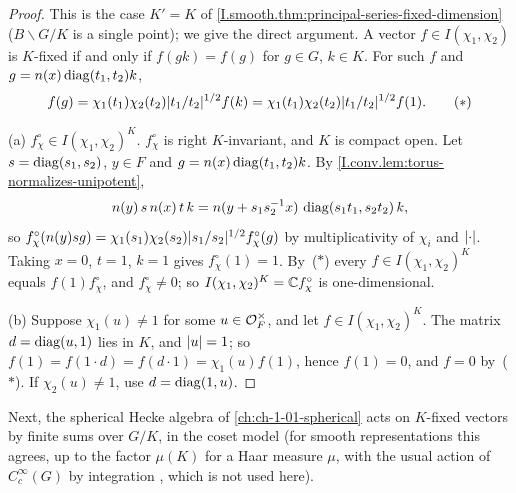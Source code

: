 \begin{theorem}
\end{theorem}
\begin{proof}
This is the case $K'=K$ of \cref{I.smooth.thm:principal-series-fixed-dimension} ($B\backslash G/K$ is a single point);
we give the direct argument. A vector $f\in I(\chi_1,\chi_2)$ is $K$-fixed if and only if $f(gk)=f(g)$ for $g\in G$,
$k\in K$. For such $f$ and $g=n(x)\operatorname{diag}(t_1,t_2)k$,
\[
  f(g)=\chi_1(t_1)\chi_2(t_2)\lvert t_1/t_2\rvert^{1/2}f(k)=\chi_1(t_1)\chi_2(t_2)\lvert t_1/t_2\rvert^{1/2}f(1).\tag{$\ast$}
\]

(a) \emph{$f^\circ_\chi\in I(\chi_1,\chi_2)^K$.} $f^\circ_\chi$ is right $K$-invariant, and $K$ is compact open. Let
$s=\operatorname{diag}(s_1,s_2)$, $y\in F$ and $g=n(x)\operatorname{diag}(t_1,t_2)k$. By \cref{I.conv.lem:torus-normalizes-unipotent},
\[
  n(y)\,s\,n(x)\,t\,k=n(y+s_1s_2^{-1}x)\,\operatorname{diag}(s_1t_1,s_2t_2)\,k,
\]
so
$f^\circ_\chi(n(y)sg)=\chi_1(s_1)\chi_2(s_2)\lvert s_1/s_2\rvert^{1/2}f^\circ_\chi(g)$ by multiplicativity of $\chi_i$ and
$\lvert\cdot\rvert$. Taking $x=0$, $t=1$, $k=1$ gives $f^\circ_\chi(1)=1$. By~($\ast$) every $f\in I(\chi_1,\chi_2)^K$ equals
$f(1)f^\circ_\chi$, and $f^\circ_\chi\neq0$; so $I(\chi_1,\chi_2)^K=\mathbb{C} f^\circ_\chi$ is one-dimensional.

(b) Suppose $\chi_1(u)\neq1$ for some $u\in\mathcal{O}_F^\times$, and let $f\in I(\chi_1,\chi_2)^K$. The matrix
$d=\operatorname{diag}(u,1)$ lies in $K$, and $\lvert u\rvert=1$; so $f(1)=f(1\cdot d)=f(d\cdot1)=\chi_1(u)f(1)$, hence $f(1)=0$, and $f=0$
by~($\ast$). If $\chi_2(u)\neq1$, use $d=\operatorname{diag}(1,u)$.
\end{proof}

\noindent Next, the spherical Hecke algebra of \cref{ch:ch-1-01-spherical} acts on $K$-fixed vectors by finite sums
over $G/K$, in the coset model (for smooth representations this agrees, up to the factor $\mu(K)$ for a Haar measure $\mu$,
with the usual action of $C_c^\infty(G)$ by integration \cite[§1]{JL}, which is not used here).

\begin{definition}
\end{definition}

